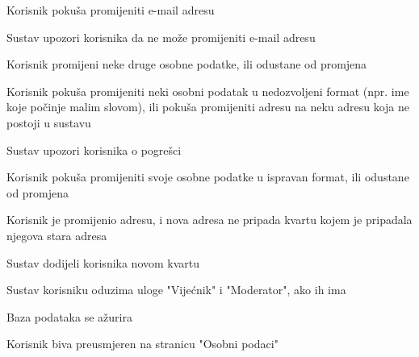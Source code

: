 \begin{packed_item}
\begin{packed_item}
							\item[3.b] Korisnik pokuša promijeniti e-mail adresu
							\item[] \begin{packed_enum}
								
								\item Sustav upozori korisnika da ne može promijeniti e-mail adresu
								\item Korisnik promijeni neke druge osobne podatke, ili odustane od promjena
								
							\end{packed_enum}
							
							\item[3.c] Korisnik pokuša promijeniti neki osobni podatak u nedozvoljeni format (npr. ime koje počinje malim slovom), ili pokuša promijeniti adresu na neku adresu koja ne postoji u sustavu
							\item[] \begin{packed_enum}
								
								\item Sustav upozori korisnika o pogrešci
								\item Korisnik pokuša promijeniti svoje osobne podatke u ispravan format, ili odustane od promjena
								
							\end{packed_enum}
							
							\item[3.c] Korisnik je promijenio adresu, i nova adresa ne pripada kvartu kojem je pripadala njegova stara adresa
							\item[] \begin{packed_enum}
								
								\item Sustav dodijeli korisnika novom kvartu
								\item Sustav korisniku oduzima uloge "Vijećnik" i "Moderator", ako ih ima
								\item Baza podataka se ažurira
								\item Korisnik biva preusmjeren na stranicu "Osobni podaci"
								
							\end{packed_enum}
							
						\end{packed_item}
					\end{packed_item}
					
